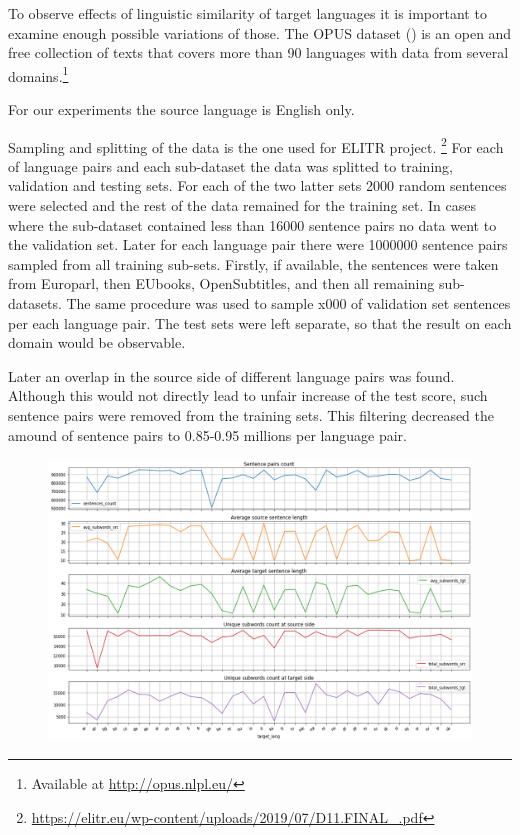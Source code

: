 To observe effects of linguistic similarity of target languages
it is important to examine enough possible variations of those.
The OPUS dataset (\cite{TIEDEMANN12.463}) is an open and free collection of texts
that covers more than 90 languages with data from several
domains.\footnote{Available at \url{http://opus.nlpl.eu/}} 

For our experiments the source language is English only.

Sampling and splitting of the data is the one used for
ELITR project.%
\footnote{\url{https://elitr.eu/wp-content/uploads/2019/07/D11.FINAL\_.pdf}}
For each of language pairs and each sub-dataset
the data was splitted to training, validation and testing sets.
For each of the two latter sets 2000 random sentences were selected
and the rest of the data remained for the training set.
In cases where the sub-dataset contained less than 16000 sentence pairs
no data went to the validation set.
Later for each language pair there were 1000000 sentence pairs
sampled from all training sub-sets.
Firstly, if available, the sentences were taken from Europarl,
then EUbooks, OpenSubtitles, and then all remaining sub-datasets.
The same procedure was used to sample x000 of validation set sentences
per each language pair.
The test sets were left separate, so that the result on each domain would be observable.

Later an overlap in the source side of different language pairs was found.
Although this would not directly lead to unfair increase of the test score,
such sentence pairs were removed from the training sets.
This filtering decreased the amound of sentence pairs
to 0.85-0.95 millions per language pair.

\begin{figure}[h]
	\centering
	\includegraphics[width=0.9\columnwidth]{../img/train_set_statistics.png}
	\label{fig:language_statistics}
\end{figure}

